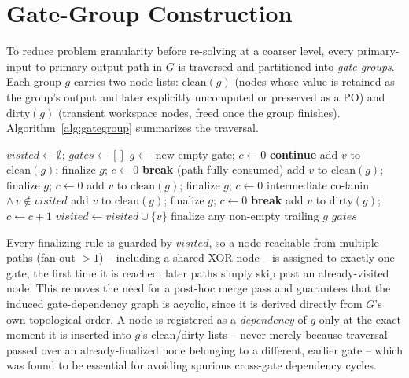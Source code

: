 \section{Gate-Group Construction}

To reduce problem granularity before re-solving at a coarser level,
every primary-input-to-primary-output path in $G$ is traversed and
partitioned into \emph{gate groups}. Each group $g$ carries two node
lists: $\mathrm{clean}(g)$ (nodes whose value is retained as the
group's output and later explicitly uncomputed or preserved as a PO)
and $\mathrm{dirty}(g)$ (transient workspace nodes, freed once the
group finishes). Algorithm~\ref{alg:gategroup} summarizes the
traversal.

\begin{algorithm}
\caption{Gate-group construction from PI--PO paths}
\label{alg:gategroup}
\begin{algorithmic}[1]
\State $\mathit{visited} \gets \emptyset$; $\mathit{gates} \gets []$
\State $g \gets$ new empty gate; $c \gets 0$ 
     \State \textbf{continue} 
      \State add $v$ to $\mathrm{clean}(g)$; finalize $g$; $c\gets0$
      \State \textbf{break} (path fully consumed)
      \State add $v$ to $\mathrm{clean}(g)$; finalize $g$; $c\gets0$
     
      \State add $v$ to $\mathrm{clean}(g)$; finalize $g$; $c\gets0$
    \State \hspace{1em}intermediate co-fanin $\wedge\, v\notin\mathit{visited}$
      \State add $v$ to $\mathrm{clean}(g)$; finalize $g$; $c\gets0$
      \State \textbf{break}
    \Else
      \State add $v$ to $\mathrm{dirty}(g)$; $c \gets c+1$
    \EndIf
    \State $\mathit{visited} \gets \mathit{visited} \cup \{v\}$
  \EndFor
\EndFor
\State finalize any non-empty trailing $g$
\State \Return $\mathit{gates}$
\end{algorithmic}
\end{algorithm}

Every finalizing rule is guarded by $\mathit{visited}$, so a node
reachable from multiple paths (fan-out $>1$) -- including a shared
XOR node -- is assigned to exactly one gate, the first time it is
reached; later paths simply skip past an already-visited node. This
removes the need for a post-hoc merge pass and guarantees that the
induced gate-dependency graph is acyclic, since it is derived
directly from $G$'s own topological order. A node is registered as a
\emph{dependency} of $g$ only at the exact moment it is inserted into
$g$'s clean/dirty lists -- never merely because traversal passed over
an already-finalized node belonging to a different, earlier gate --
which was found to be essential for avoiding spurious cross-gate
dependency cycles.

